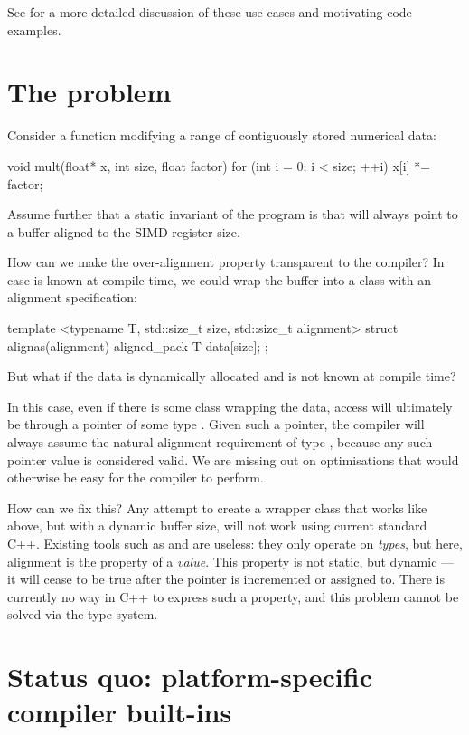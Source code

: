 See \cite{P0886R0} for a more detailed discussion of these use cases and motivating code examples.

\section{The problem}
\label{sec:problem}

Consider a function modifying a range of contiguously stored numerical data:

\begin{codeblock}
void mult(float* x, int size, float factor)
{    
    for (int i = 0; i < size; ++i)
        x[i] *= factor;
}
\end{codeblock}

Assume further that a static invariant of the program is that  will always point to a buffer aligned to the SIMD register size.

How can we make the over-alignment property transparent to the compiler? In case  is known at compile time, we could wrap the buffer into a class with an alignment specification:
\begin{codeblock}
template <typename T, std::size_t size, std::size_t alignment>
struct alignas(alignment) aligned_pack 
{
   T data[size];
};
\end{codeblock}

But what if the data is dynamically allocated and  is not known at compile time?

In this case, even if there is some class wrapping the data, access will ultimately be through a pointer of some type . Given such a pointer, the compiler will always assume the natural alignment requirement of type , because any such pointer value is considered valid. We are missing out on optimisations that would otherwise be easy for the compiler to perform.

How can we fix this? Any attempt to create a wrapper class that works like  above, but with a dynamic buffer size, will not work using current standard C++. Existing tools such as  and  are useless: they only operate on \emph{types}, but here, alignment is the property of a \emph{value}. This property is not static, but dynamic ---  it will cease to be true after the pointer is incremented or assigned to. There is currently no way in C++ to express such a property, and this problem cannot be solved via the type system. 

\section{Status quo: platform-specific compiler built-ins}
\label{sec:quo}

